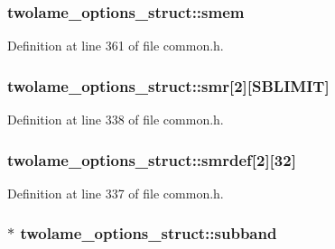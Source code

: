 \subsubsection[{\texorpdfstring{smem}{smem}}]{ twolame\+\_\+options\+\_\+struct\+::smem}\hypertarget{structtwolame__options__struct_ab497609172fe5f75806d2eb2518b206f}{}\label{structtwolame__options__struct_ab497609172fe5f75806d2eb2518b206f}


Definition at line 361 of file common.\+h.

\subsubsection[{\texorpdfstring{smr}{smr}}]{ twolame\+\_\+options\+\_\+struct\+::smr\mbox{[}2\mbox{]}\mbox{[}{\bf S\+B\+L\+I\+M\+IT}\mbox{]}}\hypertarget{structtwolame__options__struct_a9c67a9784ca70f5f6e783253db9a8a3f}{}\label{structtwolame__options__struct_a9c67a9784ca70f5f6e783253db9a8a3f}


Definition at line 338 of file common.\+h.

\subsubsection[{\texorpdfstring{smrdef}{smrdef}}]{ twolame\+\_\+options\+\_\+struct\+::smrdef\mbox{[}2\mbox{]}\mbox{[}32\mbox{]}}\hypertarget{structtwolame__options__struct_a28a0dd57c1aa50795d3b6cc6f18b39bc}{}\label{structtwolame__options__struct_a28a0dd57c1aa50795d3b6cc6f18b39bc}


Definition at line 337 of file common.\+h.

\subsubsection[{\texorpdfstring{subband}{subband}}]{$\ast$ twolame\+\_\+options\+\_\+struct\+::subband}\hypertarget{structtwolame__options__struct_adeb3816d15591347af6d058d2ccdda8c}{}\label{structtwolame__options__struct_adeb3816d15591347af6d058d2ccdda8c}


